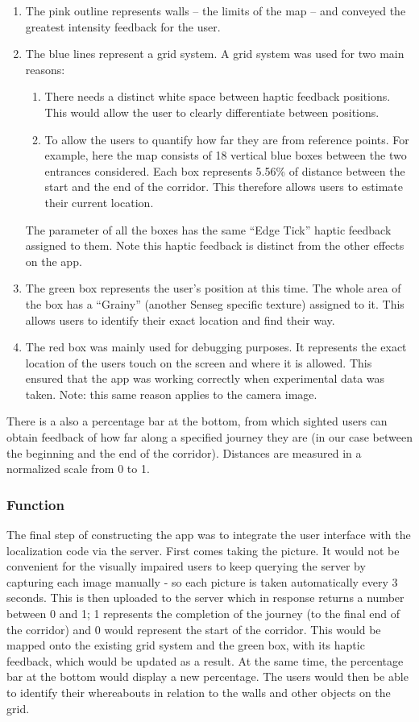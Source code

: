 \begin{enumerate}
  \item The pink outline represents walls -- the limits of the map -- and conveyed the greatest intensity feedback for the user.
  \item The blue lines represent a grid system. A grid system was used for two main reasons:
  \begin{enumerate}
  \item There needs a distinct white space between haptic feedback positions. This would allow the user to clearly differentiate between positions.
  \item To allow the users to quantify how far they are from reference points. For example, here the map consists of 18 vertical blue boxes between the two entrances considered. Each box represents  5.56\% of distance between the start and the end of the corridor. This therefore allows users to estimate their current location.
  \end{enumerate}
  The parameter of all the boxes has the same ``Edge Tick'' haptic feedback assigned to them. Note this haptic feedback is distinct from the other effects on the app.
  \item The green box represents the user's position at this time. The whole area of the box has a ``Grainy'' (another Senseg specific texture) assigned to it. This allows users to identify their exact location and find their way.
  \item The red box was mainly used for debugging purposes. It represents the exact location of the users touch on the screen and where it is allowed. This ensured that the app was working correctly when experimental data was taken. Note: this same reason applies to the camera image.
\end{enumerate} 

There is a also a percentage bar at the bottom, from which sighted users can obtain feedback of how far along a specified journey they are (in our case between the beginning and the end of the corridor). Distances are measured in a normalized scale from 0 to 1.

\subsubsection{Function}
 
The final step of constructing the app was to integrate the user interface with the localization code via the server. First comes taking the picture. It would not be convenient for the visually impaired users to keep querying the server by capturing each image manually - so each picture is taken automatically every 3 seconds. This is then uploaded to the server which in response returns a number between 0 and 1; 1 represents the completion of the journey (to the final end of the corridor) and 0 would represent the start of the corridor. This would be mapped onto the existing grid system and the green box, with its haptic feedback, which would be updated as a result. At the same time, the percentage bar at the bottom would display a new percentage. The users would then be able to identify their whereabouts in relation to the walls and other objects on the grid. 
 
